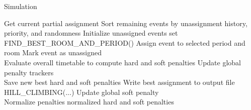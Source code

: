 \begin{algorithm}
\caption{Simulation}\label{simulation}
\begin{algorithmic}[1]
    \State Get current partial assignment
    \State Sort remaining events by unassignment history, priority, and randomness
    \State Initialize unassigned events set
\\
        \State FIND\_BEST\_ROOM\_AND\_PERIOD()
            \State Assign event to selected period and room
        \Else
            \State Mark event as unassigned
        \EndIf
    \EndFor
\\
    \State Evaluate overall timetable to compute hard and soft penalties
    \State Update global penalty trackers
\\
        \State Save new best hard and soft penalties
        \State Write best assignment to output file
            \State HILL\_CLIMBING(...)
            \State Update global soft penalty
        \EndIf
    \EndIf
\\
    \State Normalize penalties
    \State \Return normalized hard and soft penalties
\EndFunction
\end{algorithmic}
\end{algorithm}

